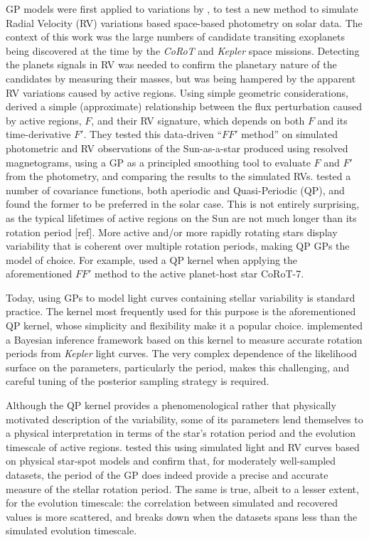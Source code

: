 \documentclass[letterpaper]{ar-1col}
\begin{document}
GP models were first applied to variations by \citet{2012MNRAS.419.3147A}, to test a new method to simulate Radial Velocity (RV) variations based space-based photometry on solar data. The context of this work was the large numbers of candidate transiting exoplanets being discovered at the time by the \textit{CoRoT} and \textit{Kepler} space missions. Detecting the planets signals in RV was needed to confirm the planetary nature of the candidates by measuring their masses, but was being hampered by the apparent RV variations caused by active regions. Using simple geometric considerations, \citet{2012MNRAS.419.3147A} derived a simple (approximate) relationship between the flux perturbation caused by active regions, $F$, and their RV signature, which depends on both $F$ and its time-derivative $F'$. They tested this data-driven ``$FF'$ method'' on simulated photometric and RV observations of the Sun-as-a-star produced using resolved magnetograms, using a GP as a principled smoothing tool to evaluate $F$ and $F'$ from the photometry, and comparing the results to the simulated RVs. \citet{2012MNRAS.419.3147A}  tested a number of covariance functions, both aperiodic and Quasi-Periodic (QP), and found the former to be preferred in the solar case. This is not entirely surprising, as the typical lifetimes of active regions on the Sun are not much longer than its rotation period [ref]. More active and/or more rapidly rotating stars display variability that is coherent over multiple rotation periods, making QP GPs the model of choice. For example, \citet{2014MNRAS.443.2517H} used a QP kernel when applying the aforementioned $FF'$ method to the active planet-host star CoRoT-7. 

Today, using GPs to model light curves containing stellar variability is standard practice. The kernel most frequently used for this purpose is the aforementioned QP kernel, whose simplicity and flexibility make it a popular choice. \citep{2018MNRAS.474.2094A} implemented a Bayesian inference framework based on this kernel to measure accurate rotation periods from \textit{Kepler} light curves. The very complex dependence of the likelihood surface on the parameters, particularly the period, makes this challenging, and careful tuning of the posterior sampling strategy is required. 

Although the QP kernel provides a phenomenological rather that physically motivated description of the variability, some of its parameters lend themselves to a physical interpretation in terms of the star's rotation period and the evolution timescale of active regions. \citep{2022MNRAS.tmp.2007N} tested this using simulated light and RV curves based on physical star-spot models and confirm that, for moderately well-sampled datasets, the period of the GP does indeed provide a precise and accurate measure of the stellar rotation period. The same is true, albeit to a lesser extent, for the evolution timescale: the correlation between simulated and recovered values is more scattered, and breaks down when the datasets spans less than the simulated evolution timescale. 
\end{document}

